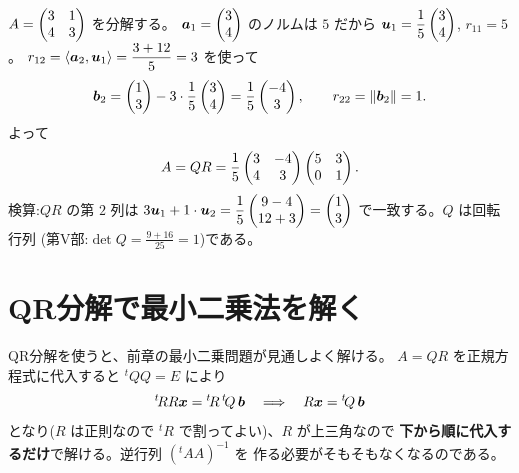 \begin{rei}[$2 \times 2$ の QR 分解]\label{rei:qr-2x2}
$A = \begin{pmatrix}3 & 1 \\ 4 & 3\end{pmatrix}$ を分解する。
$\bm{a}_1 = \begin{pmatrix}3 \\ 4\end{pmatrix}$ のノルムは $5$ だから
$\bm{u}_1 = \dfrac{1}{5}\begin{pmatrix}3 \\ 4\end{pmatrix}$, $r_{11} = 5$。
$r_{12} = \langle \bm{a}_2, \bm{u}_1 \rangle
= \dfrac{3 + 12}{5} = 3$ を使って
\[
\bm{b}_2 = \begin{pmatrix}1 \\ 3\end{pmatrix} - 3 \cdot \frac{1}{5}\begin{pmatrix}3 \\ 4\end{pmatrix}
= \frac{1}{5}\begin{pmatrix}-4 \\ 3\end{pmatrix}, \qquad r_{22} = \|\bm{b}_2\| = 1.
\]
よって
\[
A = QR = \frac{1}{5}\begin{pmatrix}3 & -4 \\ 4 & 3\end{pmatrix}\begin{pmatrix}5 & 3 \\ 0 & 1\end{pmatrix}.
\]
検算:$QR$ の第 $2$ 列は
$3\bm{u}_1 + 1 \cdot \bm{u}_2 = \dfrac{1}{5}\begin{pmatrix}9 - 4 \\ 12 + 3\end{pmatrix}
= \begin{pmatrix}1 \\ 3\end{pmatrix}$ で一致する。$Q$ は回転行列
(第V部:$\det Q = \frac{9 + 16}{25} = 1$)である。
\end{rei}

\section{QR分解で最小二乗法を解く}

QR分解を使うと、前章の最小二乗問題が見通しよく解ける。
$A = QR$ を正規方程式に代入すると ${}^t\!Q Q = E$ により
\[
{}^t\!R R \bm{x} = {}^t\!R\,{}^t\!Q\,\bm{b}
\quad\Longrightarrow\quad
R\bm{x} = {}^t\!Q\,\bm{b}
\]
となり($R$ は正則なので ${}^t\!R$ で割ってよい)、$R$ が上三角なので
\textbf{下から順に代入するだけ}で解ける。逆行列 $({}^t\!AA)^{-1}$ を
作る必要がそもそもなくなるのである。

